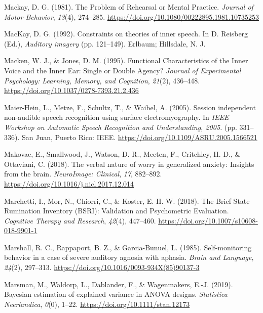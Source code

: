 \documentclass[a4paper,12pt,twoside,openright,oldfontcommands]{memoir}
\begin{document}
\leavevmode\hypertarget{ref-mackay_problem_1981}{}%
Mackay, D. G. (1981). The Problem of Rehearsal or Mental Practice. \emph{Journal of Motor Behavior}, \emph{13}(4), 274--285. \url{https://doi.org/10.1080/00222895.1981.10735253}

\leavevmode\hypertarget{ref-mackay_constraints_1992}{}%
MacKay, D. G. (1992). Constraints on theories of inner speech. In D. Reisberg (Ed.), \emph{Auditory imagery} (pp. 121--149). Erlbaum; Hillsdale, N. J.

\leavevmode\hypertarget{ref-macken_functional_1995}{}%
Macken, W. J., \& Jones, D. M. (1995). Functional Characteristics of the Inner Voice and the Inner Ear: Single or Double Agency? \emph{Journal of Experimental Psychology: Learning, Memory, and Cognition}, \emph{21}(2), 436--448. \url{https://doi.org/10.1037/0278-7393.21.2.436}

\leavevmode\hypertarget{ref-maier-hein_session_2005}{}%
Maier-Hein, L., Metze, F., Schultz, T., \& Waibel, A. (2005). Session independent non-audible speech recognition using surface electromyography. In \emph{IEEE Workshop on Automatic Speech Recognition and Understanding, 2005.} (pp. 331--336). San Juan, Puerto Rico: IEEE. \url{https://doi.org/10.1109/ASRU.2005.1566521}

\leavevmode\hypertarget{ref-makovac_verbal_2018}{}%
Makovac, E., Smallwood, J., Watson, D. R., Meeten, F., Critchley, H. D., \& Ottaviani, C. (2018). The verbal nature of worry in generalized anxiety: Insights from the brain. \emph{NeuroImage: Clinical}, \emph{17}, 882--892. \url{https://doi.org/10.1016/j.nicl.2017.12.014}

\leavevmode\hypertarget{ref-marchetti_brief_2018}{}%
Marchetti, I., Mor, N., Chiorri, C., \& Koster, E. H. W. (2018). The Brief State Rumination Inventory (BSRI): Validation and Psychometric Evaluation. \emph{Cognitive Therapy and Research}, \emph{42}(4), 447--460. \url{https://doi.org/10.1007/s10608-018-9901-1}

\leavevmode\hypertarget{ref-marshall_self-monitoring_1985}{}%
Marshall, R. C., Rappaport, B. Z., \& Garcia-Bunuel, L. (1985). Self-monitoring behavior in a case of severe auditory agnosia with aphasia. \emph{Brain and Language}, \emph{24}(2), 297--313. \url{https://doi.org/10.1016/0093-934X(85)90137-3}

\leavevmode\hypertarget{ref-marsman_bayesian_2019}{}%
Marsman, M., Waldorp, L., Dablander, F., \& Wagenmakers, E.-J. (2019). Bayesian estimation of explained variance in ANOVA designs. \emph{Statistica Neerlandica}, \emph{0}(0), 1--22. \url{https://doi.org/10.1111/stan.12173}
\end{document}
